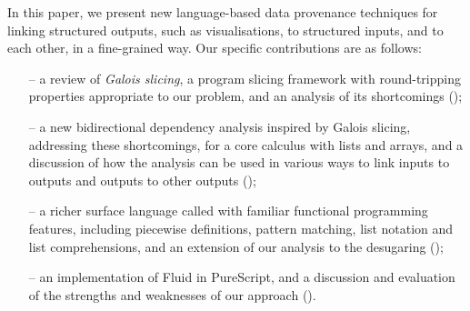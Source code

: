 In this paper, we present new language-based data provenance techniques for linking structured outputs, such as visualisations, to structured inputs, and to each other, in a fine-grained way. Our specific contributions are as follows:

\begin{itemize}[leftmargin=*]
   \item[--] a review of \emph{Galois slicing}, a program slicing framework with round-tripping properties appropriate to our problem, and an analysis of its shortcomings ();
   \item[--] a new bidirectional dependency analysis inspired by Galois slicing, addressing these shortcomings, for a core calculus with lists and arrays, and a discussion of how the analysis can be used in various ways to link inputs to outputs and outputs to other outputs ();
   \item[--] a richer surface language called \OurLanguage with familiar functional programming features, including piecewise definitions, pattern matching, list notation and list comprehensions, and an extension of our analysis to the desugaring ();
   \item[--] an implementation of Fluid in PureScript, and a discussion and evaluation of the strengths and weaknesses of our approach ().
\end{itemize}
